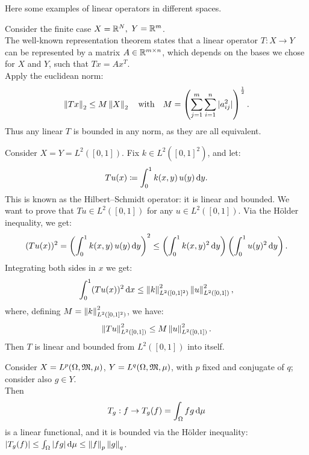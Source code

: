 Here some examples of linear operators in different spaces.
\begin{exam}
	Consider the finite case $X=\mathbb R^N,$ $Y=\mathbb R^m$.\\
	The well-known representation theorem states that a linear operator $T : X \to Y$ can be represented by a matrix $ A \in \mathbb R^{m\times n}$, which depends on the bases we chose for $X$ and $Y$, such that $Tx=Ax^T$. \\
	Apply the euclidean norm:
	$$
		\left\lVert Tx\right\rVert_2\leq M \left\lVert X\right\rVert_2 
		\quad \text{with}
		\quad M 
		= \left(\sum_{j=1}^{m}\sum_{i=1}^{n}|a_{ij}^2|\right)^{\frac 1 2}
	.
	$$
	Thus any linear $T$ is bounded in any norm, as they are all equivalent.
\end{exam}
\begin{exam}
	Consider $X=Y=L^2([0,1])$. Fix $k \in L^2([0,1]^2)$, and let:
	$$Tu(x) \coloneqq \int_0^1 k(x,y) \, u(y) \, \mathrm d y.$$
	This is known as the Hilbert--Schmidt operator: it is linear and bounded. We want to prove that $Tu \in L^2([0,1])$ for any $u \in L^2([0,1])$.
	Via the Hölder inequality, we get:
	$$	
		(Tu(x))^2
		=\left(\int_0^1 k(x,y) \, u(y) \,\mathrm d y\right)^2
		\leq\left(\int_0^1 k(x,y)^2\,\mathrm d y\right) \left(\int_0^1 u(y)^2\,\mathrm d y\right)
	.
	$$
	Integrating both sides in $x$ we get:
	$$
		\int_0^1 (Tu(x))^2 \,\mathrm d x
		\leq \left\lVert k\right\rVert^2_{L^2([0,1]^2)}  \left\lVert u\right\rVert^2_{L^2([0,1])}
	,
	$$
	where, defining $M = \left\lVert k\right\rVert^2_{L^2([0,1]^2)}$, we have:
	$$ \left\lVert Tu\right\rVert^2_{L^2([0,1])} \leq M\left\lVert u\right\rVert^2_{L^2([0,1])}.$$
	Then $T$ is linear and bounded from $L^2([0,1])$ into itself.
\end{exam}
\begin{exam}
	Consider $X=L^p(\Omega, \mathfrak M, \mu)$, $Y = L^q(\Omega, \mathfrak M, \mu)$, with $p$ fixed and conjugate of $q$; consider also $g \in Y$. \\
	Then $$T_g:f \to T_g(f) = \int_\Omega fg \,\mathrm d \mu$$ is a linear functional, and it is bounded via the Hölder inequality: $|T_g(f)| \le \int_\Omega |fg| \,\mathrm d \mu \le \left\lVert f\right\rVert_p \left\lVert g\right\rVert_q$.
\end{exam}

